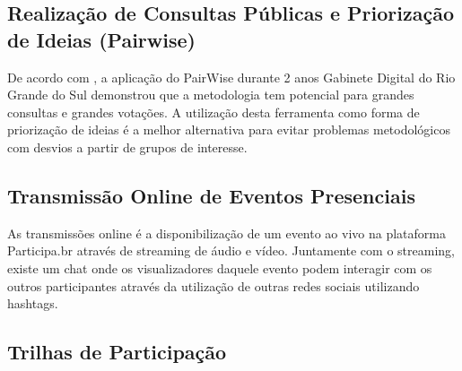 \subsection{Realização de Consultas Públicas e Priorização de Ideias (Pairwise)}

De acordo com \cite{solagna2014metodologias}, a aplicação do PairWise durante 2 anos Gabinete Digital do Rio Grande do Sul demonstrou que a metodologia tem potencial para grandes consultas e grandes votações. A utilização desta ferramenta como forma de priorização de ideias é a melhor alternativa para evitar problemas metodológicos com desvios a partir de grupos de interesse.

\subsection{Transmissão Online de Eventos Presenciais}

As transmissões online é a disponibilização de um evento ao vivo na plataforma Participa.br através de streaming de áudio e vídeo. Juntamente com o streaming, existe um chat onde os visualizadores daquele evento podem interagir com os outros participantes através da utilização de outras redes sociais utilizando hashtags.

\subsection{Trilhas de Participação}















